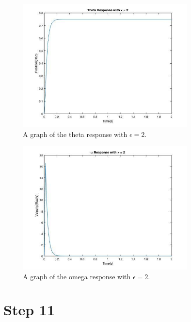 \begin{figure}[H]
	\centering
	\includegraphics[width=0.8\textwidth]{./figures/lab6_thetaresponse_e_2.jpg}
	\caption{A graph of the theta response with $\epsilon = 2$.}
	\label{fig:}
\end{figure}

\begin{figure}[H]
	\centering
	\includegraphics[width=0.8\textwidth]{./figures/lab6_omegaresponse_e_2.jpg}
	\caption{A graph of the omega response with $\epsilon = 2$.}
	\label{fig:}
\end{figure}


\section{Step 11}

